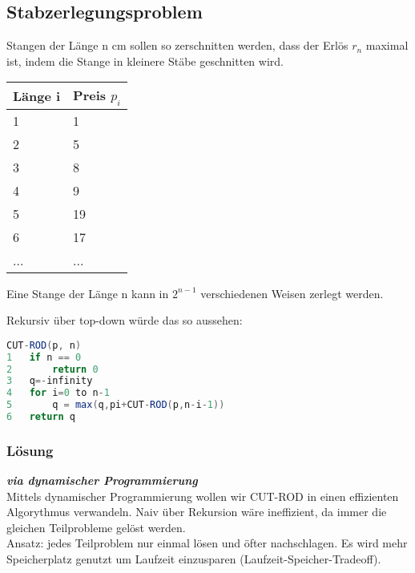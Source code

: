 \documentclass[jou,apacite]{apa6}
\begin{document}
\subsection{Stabzerlegungsproblem}
Stangen der Länge n cm sollen so zerschnitten werden, dass der Erlös $r_n$ maximal ist, indem die Stange in kleinere Stäbe geschnitten wird.

\begin{table}[h]
\centering
\begin{tabular}{|l|l|}
\hline
Länge i                 & Preis $p_i$              \\ \hline
\multicolumn{1}{|l|}{1} & \multicolumn{1}{l|}{1}  \\
\multicolumn{1}{|l|}{2} & \multicolumn{1}{l|}{5}  \\
\multicolumn{1}{|l|}{3} & \multicolumn{1}{l|}{8}  \\
\multicolumn{1}{|l|}{4} & \multicolumn{1}{l|}{9}  \\
\multicolumn{1}{|l|}{5} & \multicolumn{1}{l|}{19} \\
\multicolumn{1}{|l|}{6} & \multicolumn{1}{l|}{17} \\ 
...                     & ...                     \\ \hline
\end{tabular}
\end{table}

Eine Stange der Länge n kann in $2^{n-1}$ verschiedenen Weisen zerlegt werden.

Rekursiv über top-down würde das so aussehen:

\begin{lstlisting}[language=java]
CUT-ROD(p, n)
1   if n == 0
2       return 0
3   q=-infinity
4   for i=0 to n-1
5       q = max(q,pi+CUT-ROD(p,n-i-1))
6   return q
\end{lstlisting}

\subsubsection{Lösung}
{\itshape\bfseries via dynamischer Programmierung }\\
Mittels dynamischer Programmierung wollen wir CUT-ROD in einen effizienten Algorythmus verwandeln. Naiv über Rekursion wäre ineffizient, da immer die gleichen Teilprobleme gelöst werden. \\
Ansatz: jedes Teilproblem nur einmal lösen und öfter nachschlagen. Es wird mehr Speicherplatz genutzt um Laufzeit einzusparen (Laufzeit-Speicher-Tradeoff). 
\end{document}
